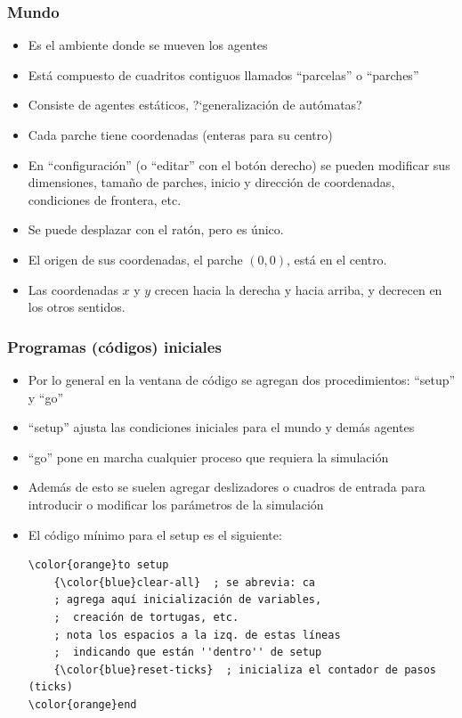 \documentclass{beamer}
\begin{document}
\begin{frame}[t]
\frametitle{Mundo}
\begin{itemize}[<+->]
	\item Es el ambiente donde se mueven los agentes
	\item Está compuesto de cuadritos contiguos llamados ``parcelas'' o ``parches''
	\item Consiste de agentes estáticos, ?`generalización de autómatas?
	\item Cada parche tiene coordenadas (enteras para su centro)
	\item En ``configuración'' (o ``editar'' con el botón derecho) se pueden modificar sus dimensiones, tamaño de parches, inicio y dirección de coordenadas, condiciones de frontera, etc.
	\item Se puede desplazar con el ratón, pero es único.
	\item El origen de sus coordenadas, el parche $(0,0)$, está en el centro.
	\item Las coordenadas $x$ y $y$ crecen hacia la derecha y hacia arriba, y decrecen en los otros sentidos.
\end{itemize}
\end{frame}


\begin{frame}[fragile]
\frametitle{Programas (códigos) iniciales}
\begin{itemize}[<+->]
	\item Por lo general en la ventana de código se agregan dos procedimientos: ``setup'' y ``go''
	\item ``setup'' ajusta las condiciones iniciales para el mundo y demás agentes
	\item ``go'' pone en marcha cualquier proceso que requiera la simulación
	\item Además de esto se suelen agregar deslizadores o cuadros de entrada para introducir o modificar los parámetros de la simulación
	\item El código mínimo para el setup es el siguiente:
\begin{Verbatim}[commandchars=\\\{\}]
\color{orange}to setup
    {\color{blue}clear-all}  ; se abrevia: ca
    ; agrega aquí inicialización de variables,
    ;  creación de tortugas, etc.
    ; nota los espacios a la izq. de estas líneas
    ;  indicando que están ''dentro'' de setup
    {\color{blue}reset-ticks}  ; inicializa el contador de pasos (ticks)
\color{orange}end
\end{Verbatim}
\end{itemize}
\end{frame}
\end{document}

